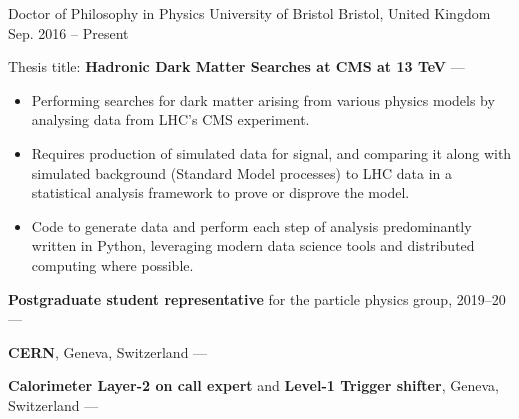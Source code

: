 
\newcommand{\vpaddingEduNorm}{\vspace{1mm}} %
\newcommand{\vpaddingEduSubpoint}{\vspace{0.75mm}} %


\begin{cventries}
    \cventry
        {Doctor of Philosophy in Physics} %
        {University of Bristol} %
        {Bristol, United Kingdom} %
        {Sep. 2016 -- Present} %
        {
        \begin{cvitems} %
            \item {Thesis title: \textbf{Hadronic Dark Matter Searches at CMS at 13 TeV} --- }
            \vpaddingEduSubpoint
            \begin{itemize}
                \item[\bullet]{Performing searches for dark matter arising from various physics models by analysing data from LHC's CMS experiment.}
                \vpaddingEduSubpoint
                \item[\bullet]{Requires production of simulated data for signal, and comparing it along with simulated background (Standard Model processes) to LHC data in a statistical analysis framework to prove or disprove the model.}
                \vpaddingEduSubpoint
                \item[\bullet]{Code to generate data and perform each step of analysis predominantly written in Python, leveraging modern data science tools and distributed computing where possible.}
            \end{itemize}
            \vpaddingEduNorm
            \item {\textbf{Postgraduate student representative} for the particle physics group, 2019--20 --- }
            \vpaddingEduNorm
            \item {\textbf{CERN}, Geneva, Switzerland --- }
            \vpaddingEduNorm
            \item {\textbf{Calorimeter Layer-2 on call expert} and \textbf{Level-1 Trigger shifter}, Geneva, Switzerland --- }

\end{cvitems}}
\end{cventries}
